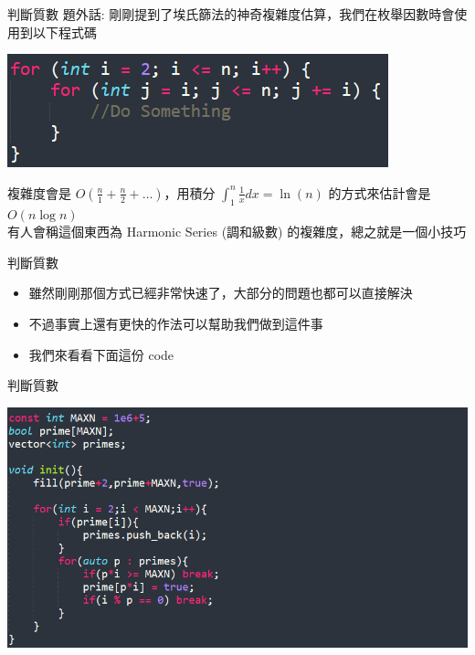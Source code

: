 \documentclass[aspectratio=169]{beamer}
\begin{document}
\begin{frame}[fragile]{判斷質數}
    題外話: 剛剛提到了埃氏篩法的神奇複雜度估算，我們在枚舉因數時會使用到以下程式碼
    \begin{center}
        \includegraphics[]{images/code10.png}
    \end{center} \pause
    複雜度會是 $\displaystyle O(\frac{n}{1}+\frac{n}{2}+\dots)$，用積分 $\displaystyle \int^n_1 \frac{1}{x} dx = \ln(n)$ 的方式來估計會是 $O(n \log n)$ \\
    有人會稱這個東西為 Harmonic Series (調和級數) 的複雜度，總之就是一個小技巧
\end{frame}

\begin{frame}[fragile]{判斷質數}
    \begin{itemize}
        \item<1-> 雖然剛剛那個方式已經非常快速了，大部分的問題也都可以直接解決
        \item<1-> 不過事實上還有更快的作法可以幫助我們做到這件事
        \item<3-> 我們來看看下面這份 code
    \end{itemize}
\end{frame}

\begin{frame}[fragile]{判斷質數}
    \begin{center}
        \includegraphics[scale=0.6]{images/code5.png}
    \end{center}
\end{frame}
\end{document}
